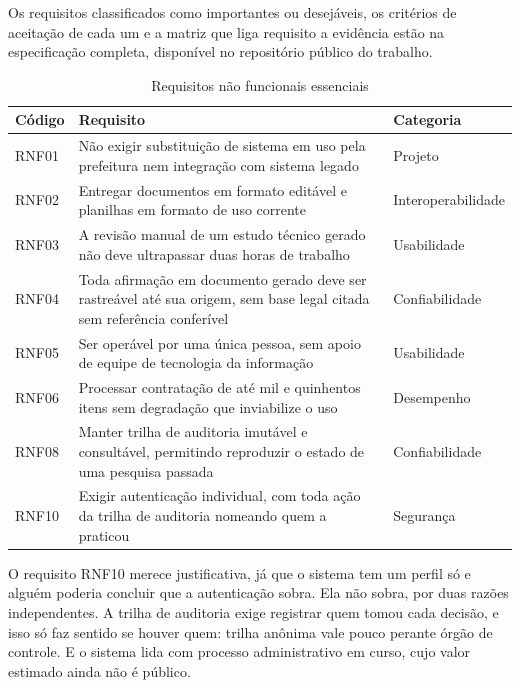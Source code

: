 Os requisitos classificados como importantes ou desejáveis, os critérios de
aceitação de cada um e a matriz que liga requisito a evidência estão na
especificação completa, disponível no repositório público do trabalho.

\begin{table}[H]
  \centering
  \caption{Requisitos não funcionais essenciais}
  \label{tab:rnf-essenciais}
  \begin{ufopaespacosimples}
  \small
  \begin{tabularx}{\textwidth}{@{}lXl@{}}
    \toprule
    \textbf{Código} & \textbf{Requisito} & \textbf{Categoria} \\
    \midrule
    RNF01 & Não exigir substituição de sistema em uso pela prefeitura nem
      integração com sistema legado & Projeto \\
    RNF02 & Entregar documentos em formato editável e planilhas em formato de
      uso corrente & Interoperabilidade \\
    RNF03 & A revisão manual de um estudo técnico gerado não deve ultrapassar
      duas horas de trabalho & Usabilidade \\
    RNF04 & Toda afirmação em documento gerado deve ser rastreável até sua
      origem, sem base legal citada sem referência conferível & Confiabilidade \\
    RNF05 & Ser operável por uma única pessoa, sem apoio de equipe de tecnologia
      da informação & Usabilidade \\
    RNF06 & Processar contratação de até mil e quinhentos itens sem degradação
      que inviabilize o uso & Desempenho \\
    RNF08 & Manter trilha de auditoria imutável e consultável, permitindo
      reproduzir o estado de uma pesquisa passada & Confiabilidade \\
    RNF10 & Exigir autenticação individual, com toda ação da trilha de auditoria
      nomeando quem a praticou & Segurança \\
    \bottomrule
  \end{tabularx}
  \end{ufopaespacosimples}
\end{table}

O requisito RNF10 merece justificativa, já que o sistema tem um perfil só e
alguém poderia concluir que a autenticação sobra. Ela não sobra, por duas razões
independentes. A trilha de auditoria exige registrar quem tomou cada decisão, e
isso só faz sentido se houver quem: trilha anônima vale pouco perante órgão de
controle. E o sistema lida com processo administrativo em curso, cujo valor
estimado ainda não é público.

